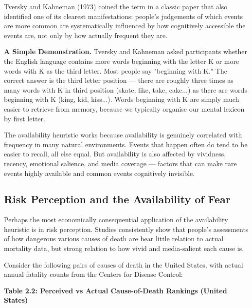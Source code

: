 \documentclass[12pt, letterpaper]{article}
\begin{document}
Tversky and Kahneman (1973) coined the term in a classic paper that also identified one of its clearest manifestations: people's judgements of which events are more common are systematically influenced by how cognitively accessible the events are, not only by how actually frequent they are.

\textbf{A Simple Demonstration.} Tversky and Kahneman asked participants whether the English language contains more words beginning with the letter K or more words with K as the third letter. Most people say "beginning with K." The correct answer is the third letter position --- there are roughly three times as many words with K in third position (skate, like, take, cake...) as there are words beginning with K (king, kid, kiss...). Words beginning with K are simply much easier to retrieve from memory, because we typically organise our mental lexicon by first letter.

The availability heuristic works because availability is genuinely correlated with frequency in many natural environments. Events that happen often do tend to be easier to recall, all else equal. But availability is also affected by vividness, recency, emotional salience, and media coverage --- factors that can make rare events highly available and common events cognitively invisible.

\medskip


\subsection{Risk Perception and the Availability of Fear}


Perhaps the most economically consequential application of the availability heuristic is in risk perception. Studies consistently show that people's assessments of how dangerous various causes of death are bear little relation to actual mortality data, but strong relation to how vivid and media-salient each cause is.

Consider the following pairs of causes of death in the United States, with actual annual fatality counts from the Centers for Disease Control:

\textbf{Table 2.2: Perceived vs Actual Cause-of-Death Rankings (United States)}
\end{document}

